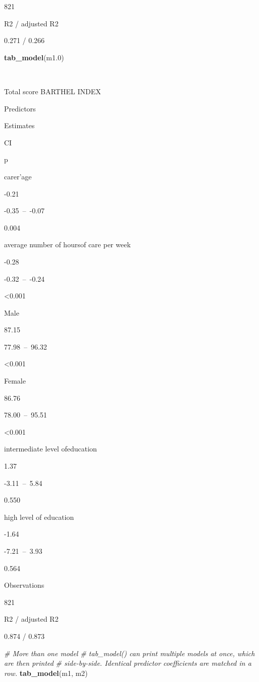 \documentclass[]{article}
\newenvironment{Shaded}{\begin{snugshade}}{\end{snugshade}}
\newcommand{\KeywordTok}[1]{\textcolor[rgb]{0.13,0.29,0.53}{\textbf{#1}}}
\newcommand{\DecValTok}[1]{\textcolor[rgb]{0.00,0.00,0.81}{#1}}
\newcommand{\CommentTok}[1]{\textcolor[rgb]{0.56,0.35,0.01}{\textit{#1}}}
\newcommand{\NormalTok}[1]{#1}
\begin{document}
821

R2 / adjusted R2

0.271 / 0.266

\begin{Shaded}
\begin{Highlighting}[]
\KeywordTok{tab_model}\NormalTok{(m1.}\DecValTok{0}\NormalTok{)}
\end{Highlighting}
\end{Shaded}

~

Total score BARTHEL INDEX

Predictors

Estimates

CI

p

carer'age

-0.21

-0.35~--~-0.07

0.004

average number of hoursof care per week

-0.28

-0.32~--~-0.24

\textless{}0.001

Male

87.15

77.98~--~96.32

\textless{}0.001

Female

86.76

78.00~--~95.51

\textless{}0.001

intermediate level ofeducation

1.37

-3.11~--~5.84

0.550

high level of education

-1.64

-7.21~--~3.93

0.564

Observations

821

R2 / adjusted R2

0.874 / 0.873

\begin{Shaded}
\begin{Highlighting}[]
\CommentTok{# More than one model}
\CommentTok{# tab_model() can print multiple models at once, which are then printed }
\CommentTok{# side-by-side. Identical predictor coefficients are matched in a row.}
\KeywordTok{tab_model}\NormalTok{(m1, m2)}
\end{Highlighting}
\end{Shaded}
\end{document}
